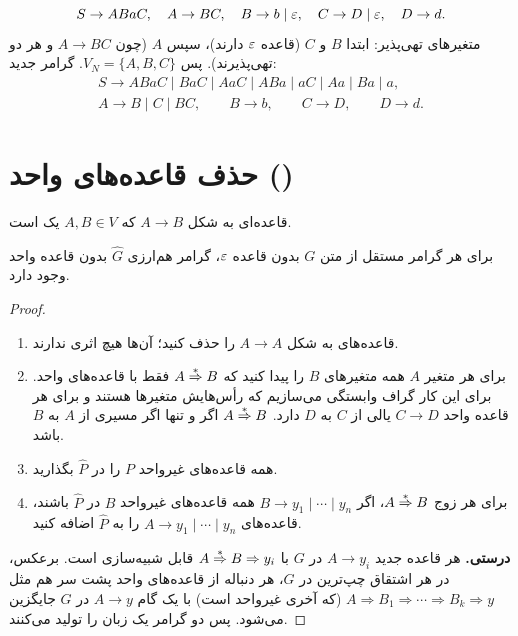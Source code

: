 \begin{example}
\[S\to ABaC,\quad A\to BC,\quad B\to b\mid\varepsilon,\quad C\to D\mid\varepsilon,\quad D\to d.\]
متغیرهای تهی‌پذیر: ابتدا $B$ و $C$ (قاعده $\varepsilon$ دارند)، سپس $A$ (چون $A\to BC$ و هر دو تهی‌پذیرند). پس $V_N=\{A,B,C\}$. گرامر جدید:
\[\begin{array}{l}
S\to ABaC\mid BaC\mid AaC\mid ABa\mid aC\mid Aa\mid Ba\mid a,\\
A\to B\mid C\mid BC,\qquad B\to b,\qquad C\to D,\qquad D\to d.
\end{array}\]
\end{example}

\section{حذف قاعده‌های واحد ()}

\begin{definition}
قاعده‌ای به شکل $A\to B$ که $A,B\in V$ یک  است.
\end{definition}

\begin{theorem}
برای هر گرامر مستقل از متن $G$ بدون قاعده $\varepsilon$، گرامر هم‌ارزی $\widehat G$ بدون قاعده واحد وجود دارد.
\end{theorem}

\begin{proof}
\begin{enumerate}
\item قاعده‌های به شکل $A\to A$ را حذف کنید؛ آن‌ها هیچ اثری ندارند.
\item برای هر متغیر $A$ همه متغیرهای $B$ را پیدا کنید که $A\overset{*}{\Rightarrow} B$ فقط با قاعده‌های واحد. برای این کار گراف وابستگی می‌سازیم که رأس‌هایش متغیرها هستند و برای هر قاعده واحد $C\to D$ یالی از $C$ به $D$ دارد. $A\overset{*}{\Rightarrow} B$ اگر و تنها اگر مسیری از $A$ به $B$ باشد.
\item همه قاعده‌های غیرواحد $P$ را در $\widehat P$ بگذارید.
\item برای هر زوج $A\overset{*}{\Rightarrow} B$، اگر $B\to y_1\mid\cdots\mid y_n$ همه قاعده‌های غیرواحد $B$ در $\widehat P$ باشند، قاعده‌های $A\to y_1\mid\cdots\mid y_n$ را به $\widehat P$ اضافه کنید.
\end{enumerate}
\textbf{درستی.} هر قاعده جدید $A\to y_i$ در $G$ با $A\overset{*}{\Rightarrow} B\Rightarrow y_i$ قابل شبیه‌سازی است. برعکس، در هر اشتقاق چپ‌ترین در $G$، هر دنباله از قاعده‌های واحد پشت سر هم مثل $A\Rightarrow B_1\Rightarrow\cdots\Rightarrow B_k\Rightarrow y$ (که آخری غیرواحد است) با یک گام $A\to y$ در $\widehat G$ جایگزین می‌شود. پس دو گرامر یک زبان را تولید می‌کنند.
\end{proof}

